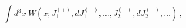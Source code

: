 \begin{equation}
\label{Wpert}
\int d^3x\ W(x; J^{(+)}_1,dJ^{(+)}_1,\ldots,J^{(-)}_2,dJ^{(-)}_2,\ldots)\,,
\end{equation}

